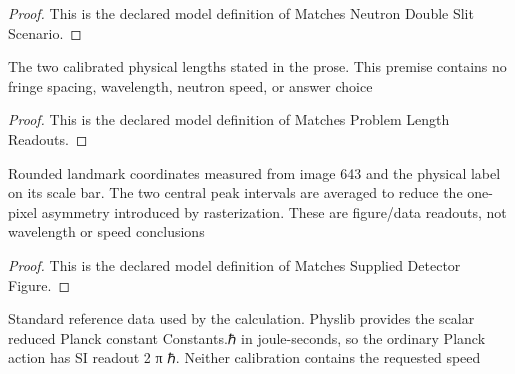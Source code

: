 \begin{proof}
  This is the declared model definition of Matches Neutron Double Slit Scenario.
\end{proof}
\begin{definition}
  \label{def:physics:phyx-mini-0643:phyxminiproblems-problemphyxmini0643-matchesproblemlengthreadouts}
  The two calibrated physical lengths stated in the prose. This premise contains no fringe spacing, wavelength, neutron speed, or answer choice
\end{definition}
\begin{proof}
  This is the declared model definition of Matches Problem Length Readouts.
\end{proof}
\begin{definition}
  \label{def:physics:phyx-mini-0643:phyxminiproblems-problemphyxmini0643-matchessupplieddetectorfigure}
  Rounded landmark coordinates measured from image 643 and the physical label on its scale bar. The two central peak intervals are averaged to reduce the one-pixel asymmetry introduced by rasterization. These are figure/data readouts, not wavelength or speed conclusions
\end{definition}
\begin{proof}
  This is the declared model definition of Matches Supplied Detector Figure.
\end{proof}
\begin{definition}
  \label{def:physics:phyx-mini-0643:phyxminiproblems-problemphyxmini0643-usesstandardneutronreferencedata}
  Standard reference data used by the calculation. Physlib provides the scalar reduced Planck constant Constants.ℏ in joule-seconds, so the ordinary Planck action has SI readout 2 π ℏ. Neither calibration contains the requested speed
\end{definition}
